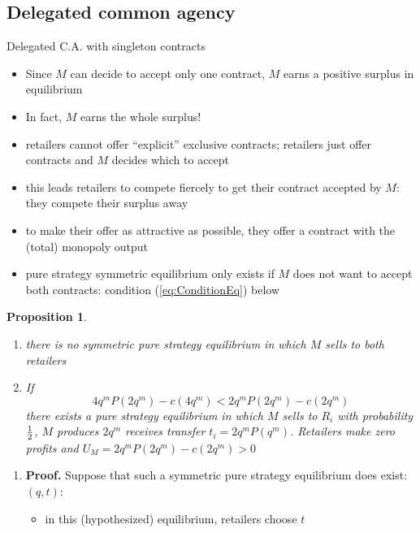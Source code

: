 \documentclass[11pt,english]{beamer}
\newcommand{\hf}{{\textstyle{1\over 2}}}
\newtheorem{proposition}{Proposition}
\begin{document}
\subsection{Delegated common agency}

\begin{frame}[allowframebreaks]{Delegated C.A. with singleton contracts}
  \begin{itemize}
  \item Since $M$ can decide to accept only one contract, $M$ earns a
    positive surplus in equilibrium
  \item In fact, $M$ earns the whole surplus!
  \item retailers cannot offer ``explicit'' exclusive contracts; retailers
    just offer contracts and $M$ decides which to accept
  \item this leads retailers to compete fiercely to get their contract
    accepted by $M$: they compete their surplus away
  \item to make their offer as attractive as possible, they offer a
    contract with the (total) monopoly output
  \item pure strategy symmetric equilibrium only exists if $M$ does
    not want to accept both contracts: condition (\ref{eq:ConditionEq}) below
  \end{itemize}
  \begin{proposition}
    \begin{enumerate}
    \item there is no symmetric pure strategy equilibrium in which $M$ sells to
      both retailers
    \item If
    \begin{equation}
      \label{eq:ConditionEq}
      4q^mP(2q^m)-c(4q^m) < 2q^mP(2q^m)-c(2q^m)
    \end{equation}
    there exists a pure strategy equilibrium in which $M$ sells to
    $R_i$ with probability $\hf$, $M$ produces $2q^m$ receives
    transfer $t_i =2q^mP(q^m)$. Retailers make zero profits and $U_M =
    2q^mP(2q^m)-c(2q^m) >0$
    \end{enumerate}
  \end{proposition}
    \begin{enumerate}
    \item   \textbf{Proof.} Suppose that such a symmetric pure
      strategy equilibrium does exist: $(q,t)$:
      \begin{itemize}
      \item in this (hypothesized) equilibrium, retailers choose $t$

\end{itemize}
\end{enumerate}
\end{frame}
\end{document}
